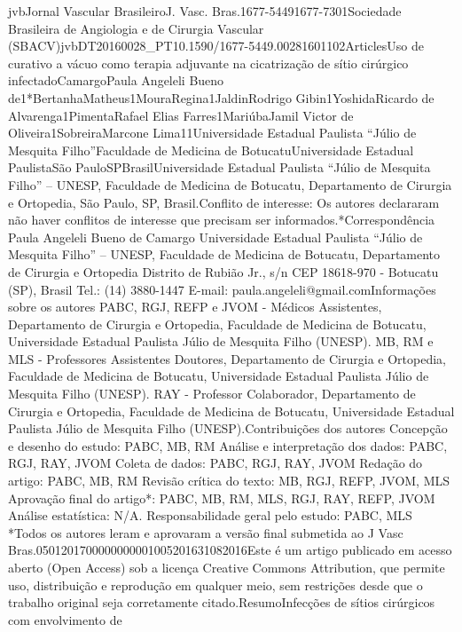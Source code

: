 \documentclass[numberinsection,times,10pt,spreadimages]{memoir}
\begin{document}
\setcounter{footnote}{4}

jvbJornal Vascular BrasileiroJ. Vasc. Bras.1677-54491677-7301Sociedade
Brasileira de Angiologia e de Cirurgia Vascular
(SBACV)jvbDT20160028\_{}PT10.1590/1677-5449.00281601102ArticlesUso de curativo a
vácuo como terapia adjuvante na cicatrização de
sítio cirúrgico infectadoCamargoPaula Angeleli Bueno
de1*BertanhaMatheus1MouraRegina1JaldinRodrigo Gibin1YoshidaRicardo de
Alvarenga1PimentaRafael Elias Farres1MariúbaJamil Victor de
Oliveira1SobreiraMarcone Lima11Universidade Estadual Paulista “Júlio de
Mesquita Filho”Faculdade de Medicina de
BotucatuUniversidade Estadual
PaulistaSão PauloSPBrasilUniversidade Estadual Paulista “Júlio de
Mesquita Filho” – UNESP, Faculdade de Medicina de Botucatu, Departamento de
Cirurgia e Ortopedia, São Paulo, SP, Brasil.Conflito de interesse: Os autores
declararam não haver conflitos de interesse
que precisam ser informados.*Correspondência Paula Angeleli Bueno de Camargo
Universidade
Estadual Paulista “Júlio de Mesquita Filho” – UNESP, Faculdade de Medicina de
Botucatu, Departamento de Cirurgia e Ortopedia Distrito de Rubião Jr., s/n CEP
18618-970 - Botucatu (SP), Brasil Tel.: (14) 3880-1447 E-mail:
paula.angeleli@gmail.comInformações sobre os autores PABC, RGJ, REFP e JVOM -
Médicos Assistentes,
Departamento de Cirurgia e Ortopedia, Faculdade de Medicina de Botucatu,
Universidade Estadual Paulista Júlio de Mesquita Filho (UNESP). MB, RM e MLS
- Professores Assistentes Doutores, Departamento de Cirurgia e Ortopedia,
Faculdade de Medicina de Botucatu, Universidade Estadual Paulista Júlio de
Mesquita Filho (UNESP). RAY - Professor Colaborador, Departamento de
Cirurgia e Ortopedia, Faculdade de Medicina de Botucatu, Universidade
Estadual Paulista Júlio de Mesquita Filho (UNESP).Contribuições dos autores
Concepção e desenho do estudo: PABC, MB, RM Análise
e interpretação dos dados: PABC, RGJ, RAY, JVOM Coleta de dados: PABC, RGJ,
RAY, JVOM Redação do artigo: PABC, MB, RM Revisão crítica do texto: MB, RGJ,
REFP, JVOM, MLS Aprovação final do artigo*: PABC, MB, RM, MLS, RGJ, RAY,
REFP, JVOM Análise estatística: N/A. Responsabilidade geral pelo estudo:
PABC, MLS *Todos os autores leram e aprovaram a versão final submetida ao J
Vasc Bras.0501201700000000001005201631082016Este é um artigo publicado em acesso
aberto (Open
Access) sob a licença Creative Commons
Attribution, que permite uso, distribuição e reprodução em
qualquer meio, sem restrições desde que o trabalho original seja
corretamente citado.ResumoInfecções de sítios cirúrgicos com envolvimento de
\end{document}
